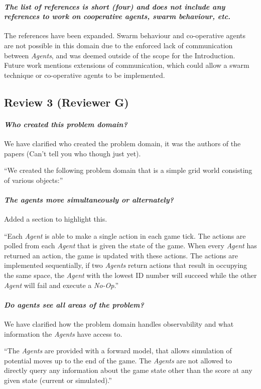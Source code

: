 \documentclass{article}
\begin{document}
\paragraph*{\textit{The list of references is short (four) and does not include any references to work on cooperative agents, swarm behaviour, etc.}}
The references have been expanded.
Swarm behaviour and co-operative agents are not possible in this domain due to the enforced lack of communication between \emph{Agents}, and was deemed outside of the scope for the Introduction. Future work mentions extensions of communication, which could allow a swarm technique or co-operative agents to be implemented.

\subsection{Review 3 (Reviewer G)}
\paragraph*{\textit{Who created this problem domain?}}
We have clarified who created the problem domain, it was the authors of the papers (Can't tell you who though just yet).

``We created the following problem domain that is a simple grid world consisting of various objects:''
\paragraph*{\textit{The agents move simultaneously or alternately?}}
Added a section to highlight this.

``Each \emph{Agent} is able to make a single action in each game tick. The actions are polled from each \emph{Agent} that is given the state of the game. When every \emph{Agent} has returned an action, the game is updated with these actions. The actions are implemented sequentially, if two \emph{Agents} return actions that result in occupying the same space, the \emph{Agent} with the lowest ID number will succeed while the other \emph{Agent} will fail and execute a \emph{No-Op}.''
\paragraph*{\textit{Do agents see all areas of the problem?}}
We have clarified how the problem domain handles observability and what information the \emph{Agents} have access to.

``The \emph{Agents} are provided with a forward model, that allows simulation of potential moves up to the end of the game. The \emph{Agents} are not allowed to directly query any information about the game state other than the score at any given state (current or simulated).''
\end{document}
